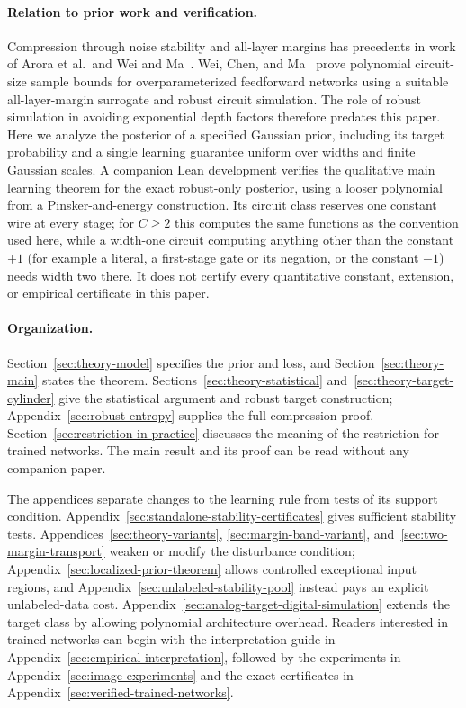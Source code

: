 \documentclass[11pt]{article}
\begin{document}
\paragraph{Relation to prior work and verification.}
Compression through noise stability and all-layer margins has precedents
in work of Arora et al.\ and Wei and Ma~\cite{arora,weima}.
Wei, Chen, and Ma~\cite{weichenma} prove polynomial circuit-size sample
bounds for overparameterized feedforward networks using a suitable
all-layer-margin surrogate and robust circuit simulation. The role of
robust simulation in avoiding exponential depth factors therefore
predates this paper. Here we analyze the posterior of a specified
Gaussian prior, including its target probability and a single learning
guarantee uniform over widths and finite Gaussian scales.
A companion Lean development verifies the qualitative main learning
theorem for the exact robust-only posterior, using a looser polynomial
from a Pinsker-and-energy construction. Its circuit class reserves one
constant wire at every stage; for $C\ge2$ this computes the same functions
as the convention used here, while a width-one circuit computing anything other than the constant $+1$
(for example a literal, a first-stage gate or its negation, or the constant $-1$) needs width two
there. It does not certify every
quantitative constant, extension, or empirical certificate in this paper.

\paragraph{Organization.}
Section~\ref{sec:theory-model} specifies the prior and loss, and
Section~\ref{sec:theory-main} states the theorem.
Sections~\ref{sec:theory-statistical} and~\ref{sec:theory-target-cylinder}
give the statistical argument and robust target construction;
Appendix~\ref{sec:robust-entropy} supplies the full compression proof.
Section~\ref{sec:restriction-in-practice} discusses the meaning of the
restriction for trained networks. The main result and its proof can be
read without any companion paper.

The appendices separate changes to the learning rule from tests of its
support condition. Appendix~\ref{sec:standalone-stability-certificates}
gives sufficient stability tests. Appendices~\ref{sec:theory-variants},
\ref{sec:margin-band-variant}, and~\ref{sec:two-margin-transport} weaken or
modify the disturbance condition; Appendix~\ref{sec:localized-prior-theorem}
allows controlled exceptional input regions, and
Appendix~\ref{sec:unlabeled-stability-pool} instead pays an explicit
unlabeled-data cost. Appendix~\ref{sec:analog-target-digital-simulation}
extends the target class by allowing polynomial architecture overhead.
Readers interested in trained networks can begin with the interpretation
guide in Appendix~\ref{sec:empirical-interpretation}, followed by the
experiments in Appendix~\ref{sec:image-experiments} and the exact
certificates in Appendix~\ref{sec:verified-trained-networks}.
\end{document}
